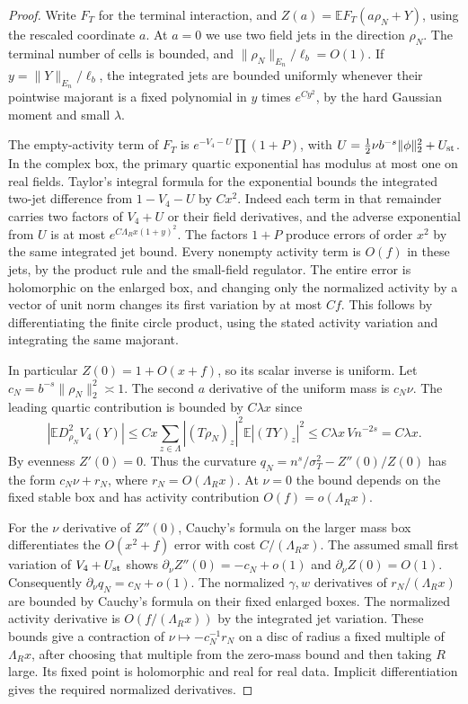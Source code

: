 \documentclass[11pt]{article}
\theoremstyle{definition}
\newcommand{\E}{\mathbb E}
\begin{document}
\begin{proof}
Write \(F_T\) for the terminal interaction, and
\(Z(a)=\E F_T(a\rho_N+Y)\), using the rescaled coordinate \(a\).
At \(a=0\) we use two field jets in the direction \(\rho_N\).
The terminal number of cells is bounded, and
\(\|\rho_N\|_{E_n}/\ell_b=O(1)\). If
\(y=\|Y\|_{E_n}/\ell_b\), the integrated jets are bounded
uniformly whenever their pointwise majorant is a fixed polynomial
in \(y\) times \(e^{C y^2}\), by the hard Gaussian moment
and small \(\lambda\).

The empty-activity term of \(F_T\) is
\(e^{-V_4-U}\prod(1+P)\), with
\(U=\tfrac12\nu b^{-s}\|\phi\|_2^2+U_{\rm st}\).
In the complex box, the primary quartic exponential has modulus
at most one on real fields. Taylor's integral formula for the
exponential bounds the integrated two-jet difference from
\(1-V_4-U\) by \(C x^2\). Indeed each term in that remainder
carries two factors of \(V_4+U\) or their field derivatives,
and the adverse exponential from \(U\) is at most
\(e^{C\Lambda_R x(1+y)^2}\). The factors \(1+P\) produce
errors of order \(x^2\) by the same integrated jet bound.
Every nonempty activity term is \(O(f)\) in these jets,
by the product rule and the small-field regulator.
The entire error is holomorphic on the enlarged box, and
changing only the normalized activity by a vector of unit norm
changes its first variation by at most \(C f\).
This follows by differentiating the finite circle product,
using the stated activity variation and integrating the same
majorant.

In particular \(Z(0)=1+O(x+f)\), so its scalar inverse is
uniform. Let
\(c_N=b^{-s}\|\rho_N\|_2^2\asymp1\).
The second \(a\) derivative of the uniform mass is \(c_N\nu\).
The leading quartic contribution is bounded by \(C\lambda x\)
since
\begin{equation}
 \left|\E D_{\rho_N}^2 V_4(Y)\right|
 \le Cx\sum_{z\in\Lambda}
      |(T\rho_N)_z|^2 \E |(TY)_z|^2
 \le C\lambda x\, V n^{-2s}
 =C\lambda x .
\end{equation}
By evenness \(Z'(0)=0\). Thus the curvature
\(q_N=n^s/\sigma_T^2-Z''(0)/Z(0)\) has the form
\(c_N\nu+r_N\), where \(r_N=O(\Lambda_R x)\).
At \(\nu=0\) the bound depends on the fixed stable box and
has activity contribution \(O(f)=o(\Lambda_R x)\).

For the \(\nu\) derivative of \(Z''(0)\), Cauchy's formula on the
larger mass box differentiates the \(O(x^2+f)\) error with
cost \(C/(\Lambda_R x)\). The assumed small first variation of
\(V_4+U_{\rm st}\) shows
\(\partial_\nu Z''(0)=-c_N+o(1)\) and
\(\partial_\nu Z(0)=O(1)\). Consequently
\(\partial_\nu q_N=c_N+o(1)\).
The normalized \(\gamma,w\) derivatives of \(r_N/(\Lambda_R x)\)
are bounded by Cauchy's formula on their fixed enlarged boxes.
The normalized activity derivative is \(O(f/(\Lambda_R x))\)
by the integrated jet variation. These bounds give a contraction
of \(\nu\mapsto-c_N^{-1}r_N\) on a disc of radius a fixed
multiple of \(\Lambda_R x\), after choosing that multiple
from the zero-mass bound and then taking \(R\) large.
Its fixed point is holomorphic and real for real data. Implicit
differentiation gives the required normalized derivatives.
\end{proof}
\end{document}
